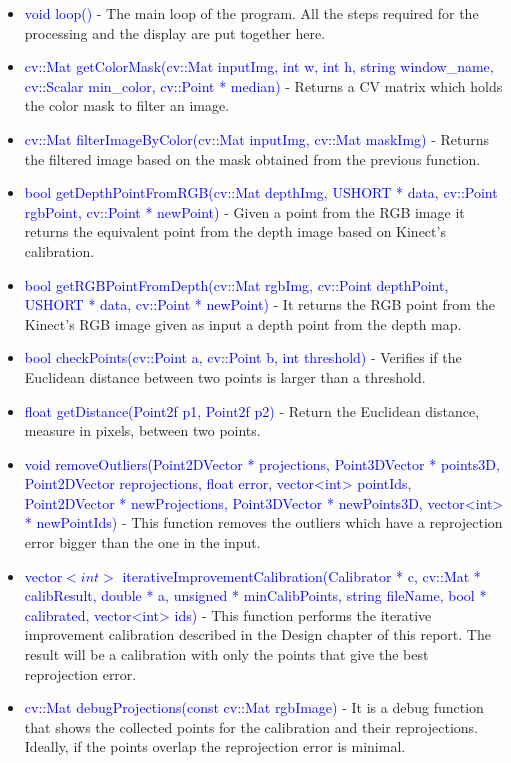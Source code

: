 \begin{itemize}
	\item \textcolor{blue}{void loop()} - The main loop of the program. All the steps required for the processing and the display are put together here.  
	\item \textcolor{blue}{cv::Mat getColorMask(cv::Mat inputImg, int w, int h, string window\_name, cv::Scalar min\_color, cv::Point * median)} - Returns a CV matrix which holds the color mask to filter an image. 
	\item \textcolor{blue}{cv::Mat filterImageByColor(cv::Mat inputImg, cv::Mat maskImg)} - Returns the filtered image based on the mask obtained from the previous function. 
	\item \textcolor{blue}{bool getDepthPointFromRGB(cv::Mat depthImg, USHORT * data, cv::Point rgbPoint, cv::Point * newPoint)} - Given a point from the RGB image it returns the equivalent point from the depth image based on Kinect's calibration. 
	\item \textcolor{blue}{bool getRGBPointFromDepth(cv::Mat rgbImg, cv::Point depthPoint, USHORT * data, cv::Point * newPoint)} - It returns the RGB point from the Kinect's RGB image given as input a depth point from the depth map.
	\item \textcolor{blue}{bool checkPoints(cv::Point a, cv::Point b, int threshold)} - Verifies if the Euclidean distance between two points is larger than a threshold. 
	\item \textcolor{blue}{float getDistance(Point2f p1, Point2f p2)} - Return the Euclidean distance, measure in pixels, between two points. 
	\item \textcolor{blue}{void removeOutliers(Point2DVector * projections, Point3DVector * points3D, Point2DVector reprojections, float error, vector<int> pointIds, Point2DVector * newProjections, Point3DVector * newPoints3D, vector<int> * newPointIds)} - This function removes the outliers which have a reprojection error bigger than the one in the input. 
	\item \textcolor{blue}{vector$<int>$ iterativeImprovementCalibration(Calibrator * c, cv::Mat * calibResult, double * a, unsigned * minCalibPoints, string fileName, bool * calibrated, vector<int> ids)} - This function performs the iterative improvement calibration described in the Design chapter of this report. The result will be a calibration with only the points that give the best reprojection error. 
	\item \textcolor{blue}{cv::Mat debugProjections(const cv::Mat rgbImage)} - It is a debug function that shows the collected points for the calibration and their reprojections. Ideally, if the points overlap the reprojection error is minimal. 

\end{itemize}
